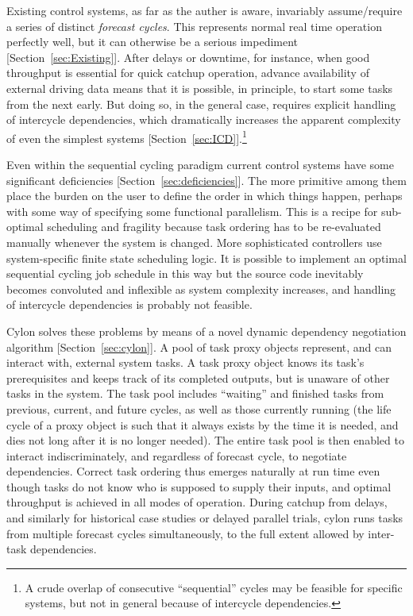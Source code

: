 \documentclass[11pt,a4paper]{article}
\begin{document}
Existing control systems, as far as the auther is aware, invariably
assume/require a series of distinct {\em forecast cycles}. This
represents normal real time operation perfectly well, but it can
otherwise be a serious impediment [Section~\ref{sec:Existing}]. After
delays or downtime, for instance, when good throughput is essential for
quick catchup operation, advance availability of external driving data
means that it is possible, in principle, to start some tasks from the
next early. But doing so, in the general case, requires explicit
handling of intercycle dependencies, which dramatically increases the
apparent complexity of even the simplest systems
[Section~\ref{sec:ICD}].\footnote{A crude overlap of consecutive
``sequential'' cycles may be feasible for specific systems, but not in
general because of intercycle dependencies.} 

Even within the sequential cycling paradigm current control systems have
some significant deficiencies [Section~\ref{sec:deficiencies}]. The more
primitive among them place the burden on the user to define the order in
which things happen, perhaps with some way of specifying some functional
parallelism.  This is a recipe for sub-optimal scheduling and fragility
because task ordering has to be re-evaluated manually whenever the
system is changed.  More sophisticated controllers use system-specific
finite state scheduling logic. It is possible to implement an optimal
sequential cycling job schedule in this way but the source code
inevitably becomes convoluted and inflexible as system complexity
increases, and handling of intercycle dependencies is probably not
feasible.  

Cylon solves these problems by means of a novel dynamic dependency
negotiation algorithm [Section~\ref{sec:cylon}]. A pool of task proxy
objects represent, and can interact with, external system tasks. A task
proxy object knows its task's prerequisites and keeps track of its
completed outputs, but is unaware of other tasks in the system. The task
pool includes ``waiting'' and finished tasks from previous, current, and
future cycles, as well as those currently running (the life cycle of a
proxy object is such that it always exists by the time it is needed, and
dies not long after it is no longer needed). The entire task pool is
then enabled to interact indiscriminately, and regardless of forecast
cycle, to negotiate dependencies. Correct task ordering thus emerges
naturally at run time even though tasks do not know who is supposed to
supply their inputs, and optimal throughput is achieved in all modes of
operation.  During catchup from delays, and similarly for historical
case studies or delayed parallel trials, cylon runs tasks from multiple
forecast cycles simultaneously, to the full extent allowed by inter-task
dependencies.
\end{document}

